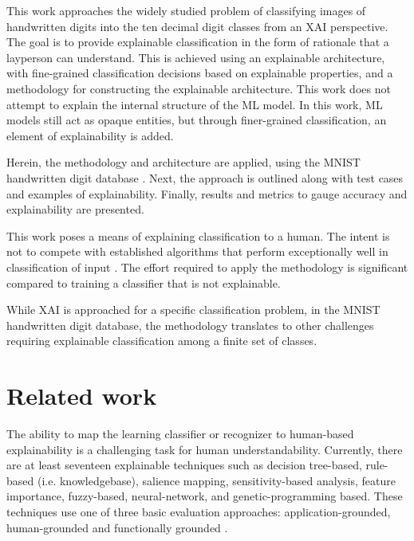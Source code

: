 \documentclass[conference]{IEEEtran}
\begin{document}


This work approaches the widely studied problem of classifying images of
handwritten digits into the ten decimal digit classes from an XAI perspective.
The goal is to provide explainable classification in the form of rationale that
a layperson can understand.  This is achieved using an explainable architecture,
with fine-grained classification decisions based on explainable properties, and
a methodology for constructing the explainable architecture.  This work does not
attempt to explain the internal structure of the ML model.  In this work, ML
models still act as opaque entities, but through finer-grained classification,
an element of explainability is added.

Herein, the methodology and architecture are applied, using the MNIST
handwritten digit database \cite{deng2012mnist}.  Next, the approach is outlined
along with test cases and examples of explainability.  Finally, results and
metrics to gauge accuracy and explainability are presented.

This work poses a means of explaining classification to a human.  The intent is
not to compete with established algorithms that perform exceptionally well in
classification of input \cite{keysers07} \cite{lecun98} \cite{schm2012}.  The
effort required to apply the methodology is significant compared to training a
classifier that is not explainable.

While XAI is approached for a specific classification problem, in the MNIST
handwritten digit database, the methodology translates to other challenges
requiring explainable classification among a finite set of classes.

\section{Related work}

The ability to map the learning classifier or recognizer to human-based
explainability is a challenging task for human understandability.  Currently,
there are at least seventeen explainable techniques such as decision tree-based,
rule-based (i.e. knowledgebase), salience mapping, sensitivity-based analysis,
feature importance, fuzzy-based, neural-network, and genetic-programming based.
These techniques use one of three basic evaluation approaches:
application-grounded, human-grounded and functionally grounded
\cite{Arrieta2020ExplainableAI,Survey18,Fuzzy19,Hagras18,GP18}.
\end{document}
